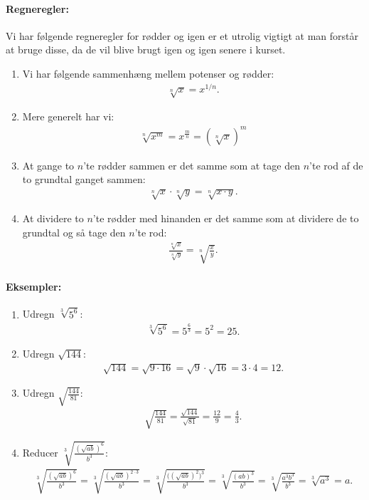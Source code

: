 \paragraph{Regneregler:}
Vi har følgende regneregler for rødder og igen er et utrolig vigtigt at man forstår at bruge disse, da de vil blive brugt igen og igen senere i kurset.

\begin{enumerate}
\item Vi har følgende sammenhæng mellem potenser og rødder:
\begin{align*}
\sqrt[n]{x}=x^{1/n}.
\end{align*}
\item Mere generelt har vi:
\begin{align*}
\sqrt[n]{x^m}=x^{\frac{m}{n}}=(\sqrt[n]{x})^m
\end{align*}
\item At gange to $n$'te rødder sammen er det samme som at tage den $n$'te rod af de to grundtal ganget sammen:
\begin{align*}
\sqrt[n]{x}\cdot \sqrt[n]{y}=\sqrt[n]{x\cdot y}.
\end{align*}
\item At dividere to $n$'te rødder med hinanden er det samme som at dividere de to grundtal og så tage den $n$'te rod:
\begin{align*}
\frac{\sqrt[n]{x}}{\sqrt[n]{y}}= \sqrt[n]{\frac{x}{y}}.
\end{align*}
\end{enumerate}

\paragraph*{Eksempler:}
\begin{enumerate}
\item Udregn $\sqrt[3]{5^6}$:
\begin{align*}
\sqrt[3]{5^6} = 5^\frac{6}{3} = 5^2 = 25.
\end{align*}
\item Udregn $\sqrt{144}$:
\begin{align*}
\sqrt{144}=\sqrt{9 \cdot 16} = \sqrt{9}\cdot \sqrt{16} = 3 \cdot 4 = 12.
\end{align*}
\item Udregn $\sqrt{\frac{144}{81}}$:
\begin{align*}
\sqrt{\frac{144}{81}} = \frac{\sqrt{144}}{\sqrt{81}}=\frac{12}{9}=\frac{4}{3}.
\end{align*}
\item Reducer $\sqrt[3]{\frac{(\sqrt{ab})^6}{b^3}}$:
\begin{align*}
\sqrt[3]{\frac{(\sqrt{ab})^6}{b^3}} = \sqrt[3]{\frac{(\sqrt{ab})^{2\cdot 3}}{b^3}} = \sqrt[3]{\frac{\big((\sqrt{ab})^2 \big)^3}{b^3}} = \sqrt[3]{\frac{(ab)^3}{b^3}}= \sqrt[3]{\frac{a^3b^3}{b^3}} = \sqrt[3]{a^3}=a.
\end{align*}
\end{enumerate}




